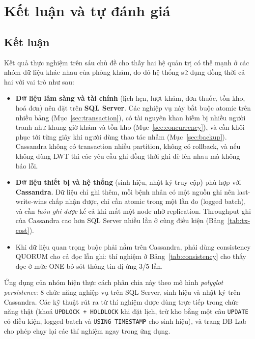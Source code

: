 \section{Kết luận và tự đánh giá}
\label{sec:conclusion}

\subsection{Kết luận}
Kết quả thực nghiệm trên sáu chủ đề cho thấy hai hệ quản trị có thế mạnh ở các nhóm dữ liệu khác nhau của phòng khám, do đó hệ thống sử dụng đồng thời cả hai với vai trò như sau:

\begin{itemize}
    \item \textbf{Dữ liệu lâm sàng và tài chính} (lịch hẹn, lượt khám, đơn thuốc, tồn kho, hoá đơn) nên đặt trên \textbf{SQL Server}. Các nghiệp vụ này bắt buộc atomic trên nhiều bảng (Mục~\ref{sec:transaction}), có tài nguyên khan hiếm bị nhiều người tranh như khung giờ khám và tồn kho (Mục~\ref{sec:concurrency}), và cần khôi phục tới từng giây khi người dùng thao tác nhầm (Mục~\ref{sec:backup}). Cassandra không có transaction nhiều partition, không có rollback, và nếu không dùng LWT thì các yêu cầu ghi đồng thời ghi đè lên nhau mà không báo lỗi.
    \item \textbf{Dữ liệu thiết bị và hệ thống} (sinh hiệu, nhật ký truy cập) phù hợp với \textbf{Cassandra}. Dữ liệu chỉ ghi thêm, mỗi bệnh nhân có một nguồn ghi nên last-write-wins chấp nhận được, chỉ cần atomic trong một lần đo (logged batch), và cần \textit{luôn ghi được} kể cả khi mất một node nhờ replication. Throughput ghi của Cassandra cao hơn SQL Server nhiều lần ở cùng điều kiện (Bảng~\ref{tab:tx-cost}).
    \item Khi dữ liệu quan trọng buộc phải nằm trên Cassandra, phải dùng consistency QUORUM cho cả đọc lẫn ghi: thí nghiệm ở Bảng~\ref{tab:consistency} cho thấy đọc ở mức ONE bỏ sót thông tin dị ứng 3/5 lần.
\end{itemize}

Ứng dụng của nhóm hiện thực cách phân chia này theo mô hình \textit{polyglot persistence}: 8 chức năng nghiệp vụ trên SQL Server, sinh hiệu và nhật ký trên Cassandra. Các kỹ thuật rút ra từ thí nghiệm được dùng trực tiếp trong chức năng thật (khoá \texttt{UPDLOCK + HOLDLOCK} khi đặt lịch, trừ kho bằng một câu \texttt{UPDATE} có điều kiện, logged batch và \texttt{USING TIMESTAMP} cho sinh hiệu), và trang DB Lab cho phép chạy lại các thí nghiệm ngay trong ứng dụng.

